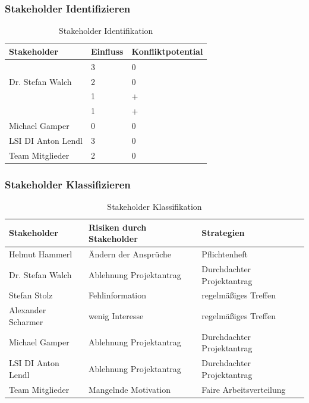 \subsubsection{Stakeholder Identifizieren}
\begin{table}[h]
	\centering
	\begin{tabular}{|lll|}
		\hline
		Stakeholder          & Einfluss &  Konfliktpotential      \\ \hline                         
		\getHammerl & 3         & 0                  \\ 
		Dr. Stefan Walch     & 2         & 0                  \\
		\getSteff        & 1         & +                  \\ 
		\getAlex   & 1         & +                  \\ 
		Michael Gamper       & 0         & 0                  \\ 
		LSI DI Anton Lendl   & 3         & 0                  \\ 
		Team Mitglieder      & 2         & 0                   \\ \hline			
	\end{tabular}
	\caption{Stakeholder Identifikation}
	\label{Tbl_Stakeholder_Identifikation}
\end{table}


\subsubsection{Stakeholder Klassifizieren}	


\begin{table}[h]
	\centering
	\begin{tabular}{|lll|}
		\hline
		Stakeholder & Risiken durch Stakeholder & Strategien                                            \\ \hline
		Helmut Hammerl & Ändern der Ansprüche & Pflichtenheft  \\
		Dr. Stefan Walch      & Ablehnung Projektantrag & Durchdachter Projektantrag \\
		Stefan Stolz         & Fehlinformation & regelmäßiges Treffen\\
		Alexander Scharmer   & wenig Interesse & regelmäßiges Treffen\\
		Michael Gamper       & Ablehnung Projektantrag  & Durchdachter Projektantrag \\
		LSI DI Anton Lendl   & Ablehnung Projektantrag & Durchdachter Projektantrag \\
		Team Mitglieder      & Mangelnde Motivation & Faire Arbeitsverteilung \\ \hline			
	\end{tabular}
	\caption{Stakeholder Klassifikation}
	\label{Tbl_Stakeholder_Klassifikation}
\end{table}

